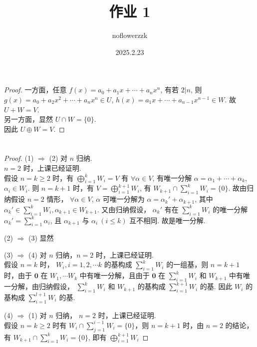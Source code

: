 \documentclass{article}
\title{作业 1}
\author{noflowerzzk}
\date{2025.2.23}
\begin{document}
\maketitle

\section{}

\begin{proof}
    一方面，任意 $f(x) = a_0 + a_1x + \cdots + a_nx^n$, 有若 $2 | n$, 则 $g(x) = a_0 + a_2x^2 + \cdots + a_nx^n \in U$, $h(x) = a_1x + \cdots + a_{n - 1}x^{n - 1} \in W$. 故 $U + W = V$. \\
    另一方面，显然 $U \cap W = \{0\}$. \\
    因此 $U \oplus W = V$.
\end{proof}

\section{}

\begin{proof}
    \item [(1) $\Rightarrow$ (2)]
    对 $n$ 归纳. \\
    $n = 2$ 时，上课已经证明. \\
    假设 $n = k \geq 2$ 时，有 $\bigoplus_{i = 1}^k W_i = V$ 有 $\forall \alpha \in V$, 有唯一分解 $\alpha = \alpha_1 + \cdots + \alpha_k$, $\alpha_i \in W_i$. 则 $n = k + 1$ 时，有 $V = \bigoplus_{i = 1}^{k + 1}W_i$, 有 $W_{k + 1} \cap \sum_{i = 1}^{k}W_i = \{0\}$. 故由归纳假设 $n = 2$ 情形， $\forall \alpha \in V$, $\alpha$ 可唯一分解为 $\alpha = \alpha_k' + \alpha_{k + 1}$, 其中 $\alpha_k' \in \sum_{i = 1}^{k}W_i, \alpha_{k + 1} \in W_{k + 1}$. 又由归纳假设， $\alpha_k'$ 有在 $\sum_{i = 1}^{k}W_i$ 的唯一分解 $\alpha_k' = \sum_{i = 1}^{k}\alpha_i$, 且 $\alpha_{k + 1}$ 与 $\alpha_i\ (i \leq k)$ 互不相同. 故是唯一分解.
    \item [(2) $\Rightarrow$ (3)] 显然
    \item [(3) $\Rightarrow$ (4)] 对 $n$ 归纳，$n = 2$ 时，上课已经证明. \\
    假设 $n = k$ 时， $W_i, i = 1, 2, \cdots k$ 的基构成 $\sum_{i = 1}^{k}W_i$ 的一组基，则 $n = k + 1$ 时，由于 $\mathbf{0}$ 在 $W_1, \cdots W_k$ 中有唯一分解，且由于 $\mathbf{0}$ 在 $\sum_{i = 1}^{k}W_i$
    和 $W_{k + 1}$ 中有唯一分解，由归纳假设， $\sum_{i = 1}^{k}W_i$
    和 $W_{k + 1}$ 的基构成 $\sum_{i = 1}^{k + 1}W_i$ 的基. 因此 $W_i$ 的基构成 $\sum_{i = 1}^{l + 1}W_i$ 的基. 
    \item [(4) $\Rightarrow$ (1)]
    对 $n$ 归纳， $n = 2$ 时，上课已经证明. \\
    假设 $n = k \geq 2$ 时有 $W_i \cap \sum_{j = 1}^{i - 1}W_i = \{0\}$，则 $n = k + 1$ 时，由 $n = 2$ 的结论，有 $W_{k + 1} \cap \sum_{i = 1}^{k}W_i = \{0\}$, 即有 $\bigoplus_{i = 1}^{k + 1}W_i$
\end{proof}
\end{document}
